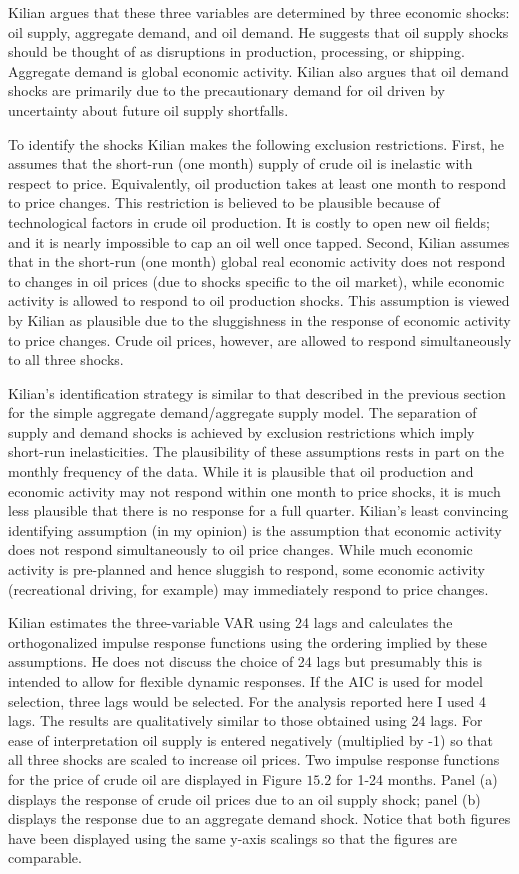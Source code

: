 \documentclass[10pt]{article}
\begin{document}
Kilian argues that these three variables are determined by three economic shocks: oil supply, aggregate demand, and oil demand. He suggests that oil supply shocks should be thought of as disruptions in production, processing, or shipping. Aggregate demand is global economic activity. Kilian also argues that oil demand shocks are primarily due to the precautionary demand for oil driven by uncertainty about future oil supply shortfalls.

To identify the shocks Kilian makes the following exclusion restrictions. First, he assumes that the short-run (one month) supply of crude oil is inelastic with respect to price. Equivalently, oil production takes at least one month to respond to price changes. This restriction is believed to be plausible because of technological factors in crude oil production. It is costly to open new oil fields; and it is nearly impossible to cap an oil well once tapped. Second, Kilian assumes that in the short-run (one month) global real economic activity does not respond to changes in oil prices (due to shocks specific to the oil market), while economic activity is allowed to respond to oil production shocks. This assumption is viewed by Kilian as plausible due to the sluggishness in the response of economic activity to price changes. Crude oil prices, however, are allowed to respond simultaneously to all three shocks.

Kilian's identification strategy is similar to that described in the previous section for the simple aggregate demand/aggregate supply model. The separation of supply and demand shocks is achieved by exclusion restrictions which imply short-run inelasticities. The plausibility of these assumptions rests in part on the monthly frequency of the data. While it is plausible that oil production and economic activity may not respond within one month to price shocks, it is much less plausible that there is no response for a full quarter. Kilian's least convincing identifying assumption (in my opinion) is the assumption that economic activity does not respond simultaneously to oil price changes. While much economic activity is pre-planned and hence sluggish to respond, some economic activity (recreational driving, for example) may immediately respond to price changes.

Kilian estimates the three-variable VAR using 24 lags and calculates the orthogonalized impulse response functions using the ordering implied by these assumptions. He does not discuss the choice of 24 lags but presumably this is intended to allow for flexible dynamic responses. If the AIC is used for model selection, three lags would be selected. For the analysis reported here I used 4 lags. The results are qualitatively similar to those obtained using 24 lags. For ease of interpretation oil supply is entered negatively (multiplied by -1) so that all three shocks are scaled to increase oil prices. Two impulse response functions for the price of crude oil are displayed in Figure $15.2$ for 1-24 months. Panel (a) displays the response of crude oil prices due to an oil supply shock; panel (b) displays the response due to an aggregate demand shock. Notice that both figures have been displayed using the same y-axis scalings so that the figures are comparable.
\end{document}
